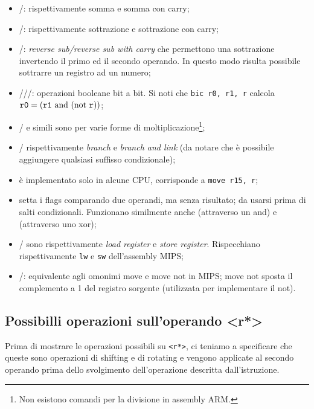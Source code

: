 \documentclass[class=book, crop=false, oneside]{standalone}
\begin{document}
\begin{itemize}
	\item {}/: rispettivamente somma e somma con carry;
	\item {}/: rispettivamente sottrazione e sottrazione con carry;
	\item {}/: \emph{reverse sub/reverse sub with carry} che permettono una sottrazione invertendo il primo ed il secondo operando. In questo modo risulta possibile sottrarre un registro ad un numero;
	\item {}///: operazioni booleane bit a bit. Si noti che \texttt{bic r0, r1, r} calcola \(\texttt{r0} = (\texttt{r1} \textrm{ and } (\textrm{not } \texttt{r}))\);
	\item {}/ e simili sono per varie forme di moltiplicazione\footnote{Non esistono comandi per la divisione in assembly ARM.};
	\item {}/ rispettivamente \emph{branch} e \emph{branch and link} (da notare che è possibile aggiungere qualsiasi suffisso condizionale);
	\item {} è implementato solo in alcune CPU, corrisponde a \texttt{move r15, r};
	\item {} setta i flags comparando due operandi, ma senza risultato; da usarsi prima di salti condizionali. Funzionano similmente anche  (attraverso un and) e  (attraverso uno xor);
	\item {}/ sono rispettivamente \emph{load register} e \emph{store register}. Rispecchiano rispettivamente \texttt{lw} e \texttt{sw} dell'assembly MIPS;
	\item {}/:  equivalente agli omonimi move e move not in MIPS; move not sposta il complemento a 1 del registro sorgente (utilizzata per implementare il not).
\end{itemize}

\subsection{Possibilli operazioni sull'operando <r*>}\label{sec:modifiche}
Prima di mostrare le operazioni possibili su \texttt{<r*>}, ci teniamo a specificare che queste sono operazioni di shifting e di rotating e vengono applicate al secondo operando prima dello svolgimento dell'operazione descritta dall'istruzione.
\end{document}

